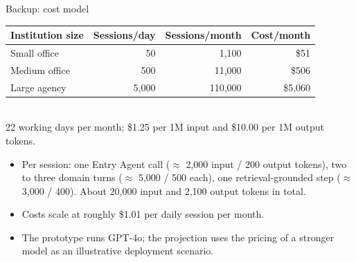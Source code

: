 \documentclass[aspectratio=169,10pt]{beamer}
\newcommand{\cmt}[1]{{\color{stone}\small #1}}          %
\begin{document}
\begin{frame}[noframenumbering]{Backup: cost model}
  \begin{table}
    \small
    \begin{tabular}{@{}lrrr@{}}
      \toprule
      \textbf{Institution size} & \textbf{Sessions/day} & \textbf{Sessions/month} & \textbf{Cost/month}\\
      \midrule
      Small office  & 50    & 1,100   & \$51\\
      Medium office & 500   & 11,000  & \$506\\
      Large agency  & 5,000 & 110,000 & \$5,060\\
      \bottomrule
    \end{tabular}
    \\[0.4em]
    \cmt{22 working days per month; \$1.25 per 1M input and \$10.00 per 1M output tokens.}
  \end{table}
  \vfill
  \begin{itemize}\small
    \item Per session: one Entry Agent call ($\approx$ 2,000 input / 200 output tokens),
      two to three domain turns ($\approx$ 5,000 / 500 each), one retrieval-grounded step
      ($\approx$ 3,000 / 400). About 20,000 input and 2,100 output tokens in total.
    \item Costs scale at roughly \$1.01 per daily session per month.
    \item The prototype runs GPT-4o; the projection uses the pricing of a stronger model as an
      illustrative deployment scenario.
  \end{itemize}
\end{frame}
\end{document}

